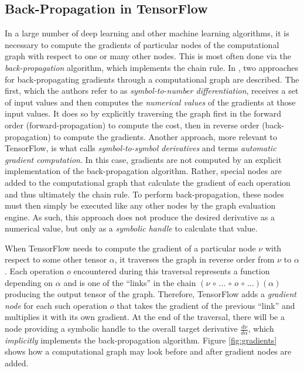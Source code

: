 \subsection{Back-Propagation in TensorFlow}\label{sec:model-ext-backprop}

In a large number of deep learning and other machine learning algorithms, it is
necessary to compute the gradients of particular nodes of the computational
graph with respect to one or many other nodes. This is most often done via the
\emph{back-propagation} algorithm, which implements the chain rule. In
\cite{goodfellow2016}, two approaches for back-propagating gradients through a
computational graph are described. The first, which the authors refer to as
\emph{symbol-to-number differentiation}, receives a set of input values and then
computes the \emph{numerical values} of the gradients at those input values. It
does so by explicitly traversing the graph first in the forward order
(forward-propagation) to compute the cost, then in reverse order
(back-propagation) to compute the gradients. Another approach, more relevant to
TensorFlow, is what \cite{goodfellow2016} calls \emph{symbol-to-symbol
  derivatives} and \cite{tensorflow} terms \emph{automatic gradient
  computation}. In this case, gradients are not computed by an explicit
implementation of the back-propagation algorithm. Rather, special nodes are
added to the computational graph that calculate the gradient of each operation
and thus ultimately the chain rule. To perform back-propagation, these nodes
must then simply be executed like any other nodes by the graph evaluation
engine. As such, this approach does not produce the desired derivative as a
numerical value, but only as a \emph{symbolic handle} to calculate that value.

When TensorFlow needs to compute the gradient of a particular node $\nu$ with
respect to some other tensor $\alpha$, it traverses the graph in reverse order
from $\nu$ to $\alpha$. Each operation $o$ encountered during this traversal
represents a function depending on $\alpha$ and is one of the ``links'' in the
chain $(\nu \,\circ\, \dots\, \circ\, o \,\circ\, \dots)(\alpha)$ producing the
output tensor of the graph. Therefore, TensorFlow adds a \emph{gradient node}
for each such operation $o$ that takes the gradient of the previous ``link'' and
multiplies it with its own gradient. At the end of the traversal, there will be
a node providing a symbolic handle to the overall target derivative
$\frac{d\nu}{d\alpha}$, which \emph{implicitly} implements the back-propagation
algorithm. Figure \ref{fig:gradients} shows how a computational graph may look
before and after gradient nodes are added.

